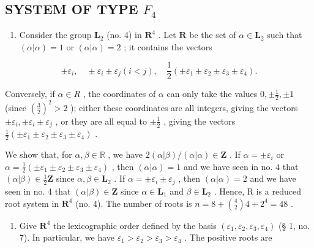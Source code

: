 \subsection{\texorpdfstring{SYSTEM OF TYPE \(F_{4}\)}{SYSTEM OF TYPE F\_4}}

\begin{enumerate}
\def\labelenumi{(\Roman{enumi})}
\tightlist
\item
  Consider the group \(\mathbf{L}_2\) (no. 4) in \(\mathbf{R}^4\) . Let \(\mathbf{R}\) be the set of \(\alpha \in \mathbf{L}_2\) such that \((\alpha |\alpha) = 1\) or \((\alpha |\alpha) = 2\) ; it contains the vectors
\end{enumerate}

\[
\pm \varepsilon_ {i}, \quad \pm \varepsilon_ {i} \pm \varepsilon_ {j} (i <   j), \quad \frac {1}{2} (\pm \varepsilon_ {1} \pm \varepsilon_ {2} \pm \varepsilon_ {3} \pm \varepsilon_ {4}).
\]

Conversely, if \(\alpha\in R\) , the coordinates of \(\alpha\) can only take the values \(0,\pm\frac{1}{2},\pm1\) (since \((\frac{3}{2})^{2}>2\) ); either these coordinates are all integers, giving the vectors \(\pm\varepsilon_{i},\pm\varepsilon_{i}\pm\varepsilon_{j}\) , or they are all equal to \(\pm\frac{1}{2}\) , giving the vectors \(\frac{1}{2}(\pm\varepsilon_{1}\pm\varepsilon_{2}\pm\varepsilon_{3}\pm\varepsilon_{4})\) .

We show that, for \(\alpha, \beta \in \mathbb{R}\) , we have \(2(\alpha|\beta) / (\alpha|\alpha) \in \mathbf{Z}\) . If \(\alpha = \pm \varepsilon_i\) or \(\alpha = \frac{1}{2} (\pm \varepsilon_1 \pm \varepsilon_2 \pm \varepsilon_3 \pm \varepsilon_4)\) , then \((\alpha|\alpha) = 1\) and we have seen in no. 4 that \((\alpha|\beta) \in \frac{1}{2}\mathbf{Z}\) since \(\alpha, \beta \in \mathbf{L}_2\) . If \(\alpha = \pm \varepsilon_i \pm \varepsilon_j\) , then \((\alpha|\alpha) = 2\) and we have seen in no. 4 that \((\alpha|\beta) \in \mathbf{Z}\) since \(\alpha \in \mathbf{L}_1\) and \(\beta \in \mathbf{L}_2\) . Hence, R is a reduced root system in \(\mathbf{R}^4\) (no. 4). The number of roots is \(n = 8 + \binom{4}{2} 4 + 2^4 = 48\) .

\begin{enumerate}
\def\labelenumi{(\Roman{enumi})}
\setcounter{enumi}{1}
\tightlist
\item
  Give \(\mathbf{R}^4\) the lexicographic order defined by the basis \((\varepsilon_1, \varepsilon_2, \varepsilon_3, \varepsilon_4)\) (§ 1, no. 7). In particular, we have \(\varepsilon_1 > \varepsilon_2 > \varepsilon_3 > \varepsilon_4\) . The positive roots are
\end{enumerate}


